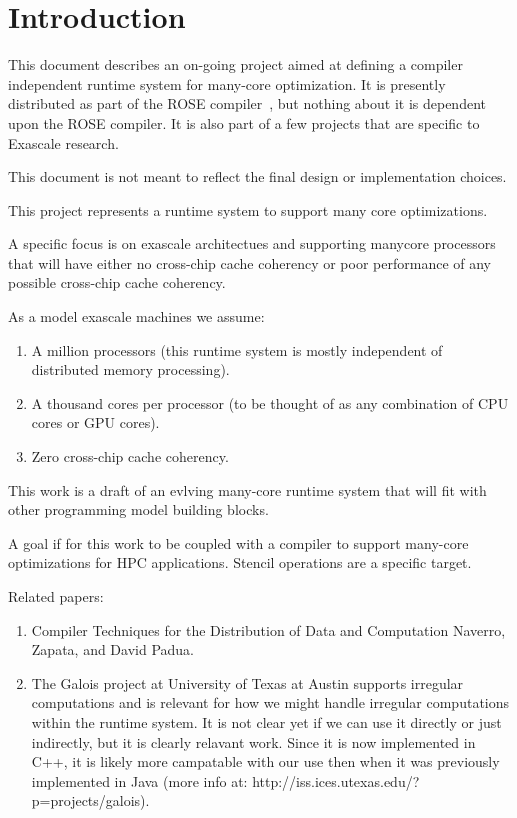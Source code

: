 \section{Introduction}
This document describes an on-going project aimed at defining a compiler independent
runtime system for many-core optimization.  It is presently distributed as 
part of the ROSE compiler~\cite{roseWeb2008}, but nothing about it is dependent 
upon the ROSE compiler. It is also part of a few projects that are specific to 
Exascale research.

This document is not meant to reflect the final design or implementation choices. 


This project represents a runtime system to support many core optimizations.

A specific focus is on exascale architectues and supporting manycore
processors that will have either no cross-chip cache coherency or 
poor performance of any possible cross-chip cache coherency.

As a model exascale machines we assume:
\begin{enumerate}
   \item A million processors (this runtime system is mostly independent of distributed
      memory processing).

   \item A thousand cores per processor (to be thought of as any combination of CPU cores
    or GPU cores).

   \item Zero cross-chip cache coherency.
\end{enumerate}


This work is a draft of an evlving many-core runtime system that will fit with 
other programming model building blocks.


A goal if for this work to be coupled with a compiler to support many-core
optimizations for HPC applications.  Stencil operations are a specific target.


\vspace{1.0}
Related papers:
\begin{enumerate}
   \item Compiler Techniques for the Distribution of Data and Computation
      Naverro, Zapata, and David Padua.
   \item The Galois project at University of Texas at Austin supports irregular 
      computations and is relevant for how we might handle irregular computations
      within the runtime system.  It is not clear yet if we can use it directly 
      or just indirectly, but it is clearly relavant work. Since it is now implemented
      in C++, it is likely more campatable with our use then when it was previously
      implemented in Java (more info at: http://iss.ices.utexas.edu/?p=projects/galois).

\end{enumerate}


